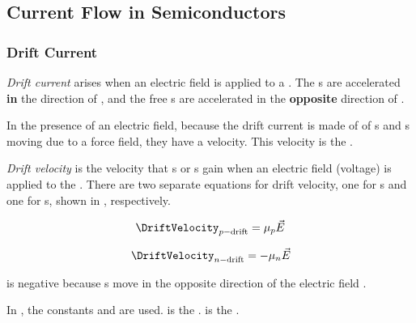 \subsection{Current Flow in Semiconductors}\label{subsec:Semiconductors_Current_Flow}
\subsubsection{Drift Current}\label{subsubsec:Drift_Current}
\begin{definition}\label{def:Drift_Current}
  \emph{Drift current} arises when an electric field \EField{} is applied to a .
  The s are accelerated \textbf{in} the direction of \EField{}, and the free s are accelerated in the \textbf{opposite} direction of \EField{}.
\end{definition}

In the presence of an electric field, because the drift current is made of of s and s moving due to a force field, they have a velocity.
This velocity is the .

\begin{definition}\label{def:Drift_Velocity}
  \emph{Drift velocity} is the velocity that s or s gain when an electric field (voltage) is applied to the .
  There are two separate equations for drift velocity, one for s and one for s, shown in , respectively.
\end{definition}

\begin{equation}\label{eq:Drift_Velocity-Hole}
  \DriftVelocity_{\HoleConcentration-\text{drift}} = \HoleMobility \EField
\end{equation}

\begin{equation}\label{eq:Drift_Velocity-Electron}
  \DriftVelocity_{\ElectronConcentration-\text{drift}} = -\ElectronMobility \EField
\end{equation}

 is negative because s move in the opposite direction of the electric field \EField{}.

In , the constants \HoleMobility{} and \ElectronMobility{} are used.
\HoleMobility{} is the .
\ElectronMobility{} is the .

